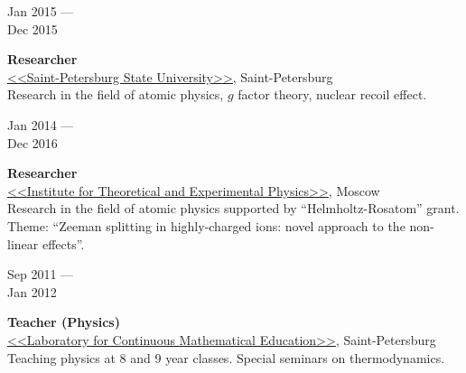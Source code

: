 \documentclass[10pt,a4paper]{article}
\newcommand{\lmpratio}{0.15}
\newcommand{\rmpratio}{0.74}
\newcommand{\verticalSpace}{0.3cm}
\newcommand{\vSpace}{0.5cm}
\newcommand{\horizontalSpace}{0.05\textwidth}
\newcommand{\sectionMain}[1]{\textbf{#1}}
\begin{document}
	\begin{minipage}[t]{\lmpratio\textwidth}
		Jan 2015 --- \\Dec 2015
	\end{minipage}
	\hspace{\horizontalSpace}
	\begin{minipage}[t]{\rmpratio\textwidth}
		\sectionMain{Researcher}\\
		\href{http://english.spbu.ru/}{<<Saint-Petersburg State University>>}, Saint-Petersburg\\[0.5cm]		
		Research in the field of atomic physics, $g$ factor theory, nuclear recoil effect. \\

	\end{minipage}
	\vspace{\vSpace}

	\begin{minipage}[t]{\lmpratio\textwidth}
		Jan 2014 --- \\Dec 2016
	\end{minipage}
	\hspace{\horizontalSpace}
	\begin{minipage}[t]{\rmpratio\textwidth}
		\sectionMain{Researcher}\\
		\href{http://frrc.itep.ru/index.php/en/}{<<Institute for Theoretical and Experimental Physics>>}, Moscow\\[0.5cm]
		Research in the field of atomic physics supported by ``Helmholtz-Rosatom'' grant. 
		Theme: ``Zeeman splitting in highly-charged ions: novel approach to the non-linear effects''. \\[0.5cm]
		
	\end{minipage}
	
	\vspace{\vSpace}

	
	
	\begin{minipage}[t]{\lmpratio\textwidth}
		Sep 2011 --- \\Jan 2012
	\end{minipage}
	\hspace{\horizontalSpace}
	\begin{minipage}[t]{\rmpratio\textwidth}
		\sectionMain{Teacher (Physics)}\\
		\href{http://lnmo.ru/}{<<Laboratory for Continuous Mathematical Education>>}, Saint-Petersburg\\[0.5cm]
		Teaching physics at 8 and 9 year classes. Special seminars on thermodynamics.
	\end{minipage}	
	\vspace{\verticalSpace}
	\vspace{\verticalSpace}
\end{document}

